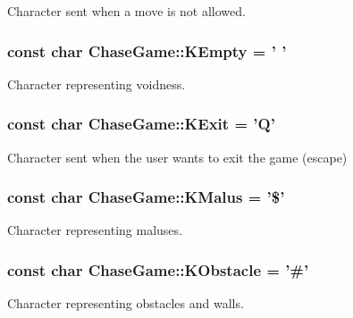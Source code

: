 Character sent when a move is not allowed. 

\hypertarget{namespace_chase_game_aa036d4de40188ba2e1aa36ab6cfaf1da}{
\subsubsection[{K\-Empty}]{\setlength{\rightskip}{0pt plus 5cm}const char Chase\-Game\-::\-K\-Empty = ' '}}\label{namespace_chase_game_aa036d4de40188ba2e1aa36ab6cfaf1da}


Character representing voidness. 

\hypertarget{namespace_chase_game_a1f787138e31b0a9dc2fbaad3547b246a}{
\subsubsection[{K\-Exit}]{\setlength{\rightskip}{0pt plus 5cm}const char Chase\-Game\-::\-K\-Exit = 'Q'}}\label{namespace_chase_game_a1f787138e31b0a9dc2fbaad3547b246a}


Character sent when the user wants to exit the game (escape) 

\hypertarget{namespace_chase_game_ad3c85aebf9881b576634247b5db00b96}{
\subsubsection[{K\-Malus}]{\setlength{\rightskip}{0pt plus 5cm}const char Chase\-Game\-::\-K\-Malus = '\$'}}\label{namespace_chase_game_ad3c85aebf9881b576634247b5db00b96}


Character representing maluses. 

\hypertarget{namespace_chase_game_ad86181b2050b912dab9d69d2f0bea76e}{
\subsubsection[{K\-Obstacle}]{\setlength{\rightskip}{0pt plus 5cm}const char Chase\-Game\-::\-K\-Obstacle = '\#'}}\label{namespace_chase_game_ad86181b2050b912dab9d69d2f0bea76e}


Character representing obstacles and walls. 

